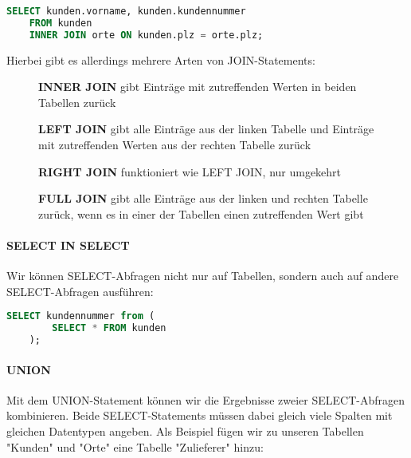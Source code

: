 \documentclass{article}
\begin{document}
	\begin{lstlisting}[language=SQL, caption=Wir erhalten Vornamen sowie Kundennummern und dazugehörige Ortsnamen]
	SELECT kunden.vorname, kunden.kundennummer 
	FROM kunden
	INNER JOIN orte ON kunden.plz = orte.plz;
	\end{lstlisting}

	Hierbei gibt es allerdings mehrere Arten von JOIN-Statements:

	\begin{figure}[h!]
		\centering
		
		\caption{\textbf{INNER JOIN} gibt Einträge mit zutreffenden Werten in beiden Tabellen zurück}
	\end{figure}

	\begin{figure}[h!]
		\centering
		
		\caption{\textbf{LEFT JOIN} gibt alle Einträge aus der linken Tabelle und Einträge mit zutreffenden Werten aus der rechten Tabelle zurück}
	\end{figure}

	\begin{figure}[h!]
		\centering
		
		\caption{\textbf{RIGHT JOIN} funktioniert wie LEFT JOIN, nur umgekehrt}
	\end{figure}

	\begin{figure}[h!]
		\centering
		
		\caption{\textbf{FULL JOIN} gibt alle Einträge aus der linken und rechten Tabelle zurück, wenn es in einer der Tabellen einen zutreffenden Wert gibt}
	\end{figure}

	\paragraph{SELECT IN SELECT}
	Wir können SELECT-Abfragen nicht nur auf Tabellen, sondern auch auf andere SELECT-Abfragen ausführen:

	\begin{lstlisting}[language=SQL]
	SELECT kundennummer from (
		SELECT * FROM kunden
	);
	\end{lstlisting}

	\paragraph{UNION}
	Mit dem UNION-Statement können wir die Ergebnisse zweier SELECT-Abfragen kombinieren. Beide SELECT-Statements müssen dabei gleich viele Spalten mit gleichen Datentypen angeben.
	Als Beispiel fügen wir zu unseren Tabellen "Kunden" und "Orte" eine Tabelle "Zulieferer" hinzu:
\end{document}
